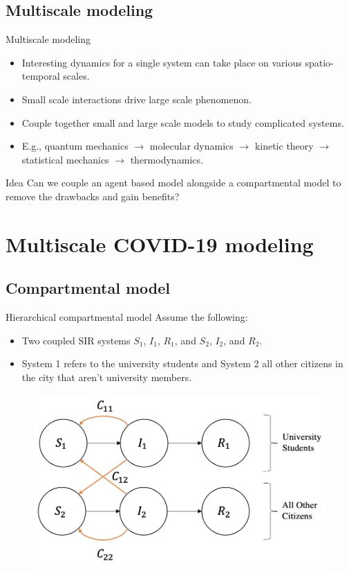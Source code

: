 \documentclass[aspectratio=169]{beamer}
\begin{document}
\subsection{Multiscale modeling}

\begin{frame}{Multiscale modeling}
    \vfill
    \begin{itemize}
    \pause
        \item Interesting dynamics for a single system can take place on various spatio-temporal scales.
        \pause
        \item Small scale interactions drive large scale phenomenon.
        \pause
        \item Couple together small and large scale models to study complicated systems.
        \pause
        \item E.g., quantum mechanics $\to$ molecular dynamics $\to$ kinetic theory $\to$ statistical mechanics $\to$ thermodynamics.
    \end{itemize}
    \vfill
\end{frame}

\begin{frame}{Idea}
    \vfill
    \pause
    Can we couple an agent based model alongside a compartmental model to remove the drawbacks and gain benefits?
    \vfill
\end{frame}

\section{Multiscale COVID-19 modeling}

\subsection{Compartmental model}

\begin{frame}{Hierarchical compartmental model}
\vfill
\pause
Assume the following:
    \begin{itemize}
    \pause
        \item Two coupled SIR systems $S_1$, $I_1$, $R_1$, and $S_2$, $I_2$, and $R_2$.
        \pause
        \item System 1 refers to the university students and System 2 all other citizens in the city that aren't university members.
        \pause
    \end{itemize}
        \begin{figure}[H]
            \centering
            \includegraphics[width=.6\textwidth]{figures/compartmental_sir.png}
        \end{figure}
        \vfill
\end{frame}
\end{document}
